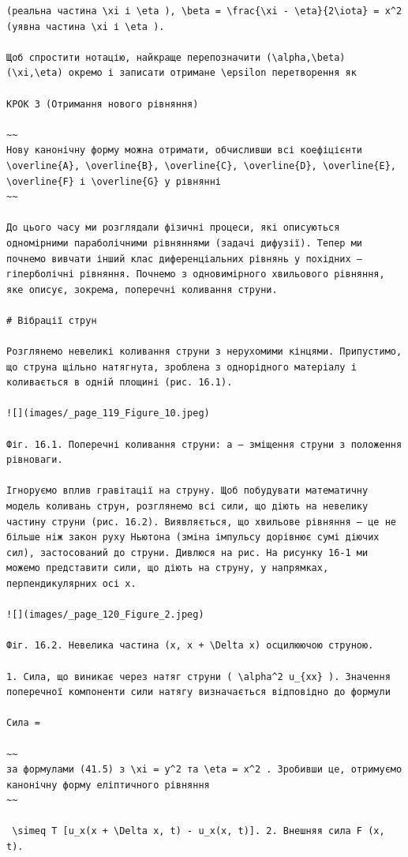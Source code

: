 \documentclass[
  ukrainian,
]{article}
\begin{document}
\begin{verbatim}
(реальна частина \xi і \eta ), \beta = \frac{\xi - \eta}{2\iota} = x^2 (уявна частина \xi і \eta ).

Щоб спростити нотацію, найкраще перепозначити (\alpha,\beta) (\xi,\eta) окремо і записати отримане \epsilon перетворення як

КРОК 3 (Отримання нового рівняння)

~~
Нову канонічну форму можна отримати, обчисливши всі коефіцієнти \overline{A}, \overline{B}, \overline{C}, \overline{D}, \overline{E}, \overline{F} і \overline{G} у рівнянні
~~

До цього часу ми розглядали фізичні процеси, які описуються одномірними параболічними рівняннями (задачі дифузії). Тепер ми почнемо вивчати інший клас диференціальних рівнянь у похідних — гіперболічні рівняння. Почнемо з одновимірного хвильового рівняння, яке описує, зокрема, поперечні коливання струни.

# Вібрації струн

Розглянемо невеликі коливання струни з нерухомими кінцями. Припустимо, що струна щільно натягнута, зроблена з однорідного матеріалу і коливається в одній площині (рис. 16.1).

![](images/_page_119_Figure_10.jpeg)

Фіг. 16.1. Поперечні коливання струни: a — зміщення струни з положення рівноваги.

Ігноруємо вплив гравітації на струну. Щоб побудувати математичну модель коливань струн, розглянемо всі сили, що діють на невелику частину струни (рис. 16.2). Виявляється, що хвильове рівняння — це не більше ніж закон руху Ньютона (зміна імпульсу дорівнює сумі діючих сил), застосований до струни. Дивлюся на рис. На рисунку 16-1 ми можемо представити сили, що діють на струну, у напрямках, перпендикулярних осі x.

![](images/_page_120_Figure_2.jpeg)

Фіг. 16.2. Невелика частина (x, x + \Delta x) осцилюючою струною.

1. Сила, що виникає через натяг струни ( \alpha^2 u_{xx} ). Значення поперечної компоненти сили натягу визначається відповідно до формули

Сила =

~~
за формулами (41.5) з \xi = y^2 та \eta = x^2 . Зробивши це, отримуємо канонічну форму еліптичного рівняння
~~

 \simeq T [u_x(x + \Delta x, t) - u_x(x, t)]. 2. Внешняя сила F (x, t).


\end{verbatim}
\end{document}
